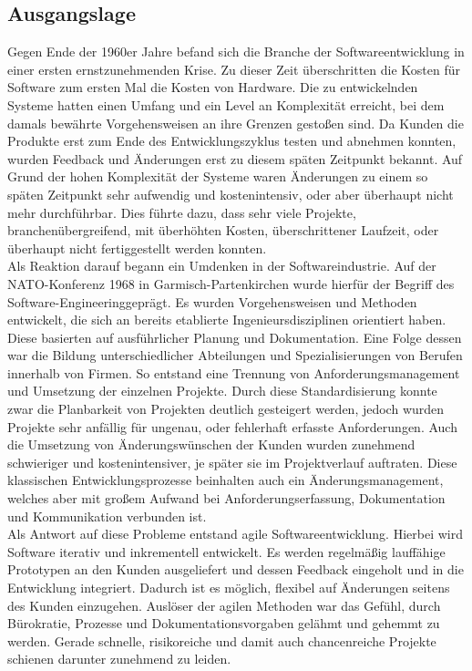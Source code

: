 \subsection{Ausgangslage}
Gegen Ende der 1960er Jahre befand sich die Branche der Softwareentwicklung in einer ersten ernstzunehmenden Krise. Zu dieser Zeit überschritten die Kosten für Software zum ersten Mal die Kosten von Hardware. Die zu entwickelnden Systeme hatten einen Umfang und ein Level an Komplexität erreicht, bei dem damals bewährte Vorgehensweisen an ihre Grenzen gestoßen sind. Da Kunden die Produkte erst zum Ende des Entwicklungszyklus testen und abnehmen konnten, wurden Feedback und Änderungen erst zu diesem späten Zeitpunkt bekannt. Auf Grund der hohen Komplexität der Systeme waren Änderungen zu einem so späten Zeitpunkt sehr aufwendig und kostenintensiv, oder aber überhaupt nicht mehr durchführbar. Dies führte dazu, dass sehr viele Projekte, branchenübergreifend, mit überhöhten Kosten, überschrittener Laufzeit, oder überhaupt nicht fertiggestellt werden konnten.\\
Als Reaktion darauf begann ein Umdenken in der Softwareindustrie. Auf der NATO-Konferenz 1968 in Garmisch-Partenkirchen wurde hierfür der Begriff des \glqq Software-Engineering\grqq geprägt. \parencite[Vgl.][S. 8]{Naur:1968} Es wurden Vorgehensweisen und Methoden entwickelt, die sich an bereits etablierte Ingenieursdisziplinen orientiert haben. Diese basierten auf ausführlicher Planung und Dokumentation. Eine Folge dessen war die Bildung unterschiedlicher Abteilungen und Spezialisierungen von Berufen innerhalb von Firmen. So entstand eine Trennung von Anforderungsmanagement und Umsetzung der einzelnen Projekte. Durch diese Standardisierung konnte zwar die Planbarkeit von Projekten deutlich gesteigert werden, jedoch wurden Projekte sehr anfällig für ungenau, oder fehlerhaft erfasste Anforderungen. Auch die Umsetzung von Änderungswünschen der Kunden wurden zunehmend schwieriger und kostenintensiver, je später sie im Projektverlauf auftraten. Diese klassischen Entwicklungsprozesse beinhalten auch ein Änderungsmanagement, welches aber mit großem Aufwand bei Anforderungserfassung, Dokumentation und Kommunikation verbunden ist.\\
Als Antwort auf diese Probleme entstand agile Softwareentwicklung. Hierbei wird Software iterativ und inkrementell entwickelt. Es werden regelmäßig lauffähige Prototypen an den Kunden ausgeliefert und dessen Feedback eingeholt und in die Entwicklung integriert. Dadurch ist es möglich, flexibel auf Änderungen seitens des Kunden einzugehen. \glqq Auslöser der agilen Methoden war das Gefühl, durch Bürokratie, Prozesse und Dokumentationsvorgaben gelähmt und gehemmt zu werden. Gerade schnelle, risikoreiche und damit auch chancenreiche Projekte schienen darunter zunehmend zu leiden.\grqq \parencite[Vgl.][S. 183]{Schneider:2007}
